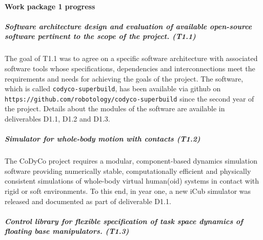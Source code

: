 

\newcommand{\EQ}{\!\!\!=\!\!\!}

\newcommand{\Bp}{\mathbf{p}}
\newcommand{\Br}{\mathbf{r}}
\newcommand{\Bf}{\mathbf{f}}
\newcommand{\BJ}{\mathbf{J}}
\newcommand{\Bv}{\mathbf{v}}
\newcommand{\BI}{\mathbf{I}}
\newcommand{\BR}{\mathbf{R}}
\newcommand{\BK}{\mathbf{K}}
\newcommand{\BD}{\mathbf{D}}
\newcommand{\BA}{\mathbf{A}}
\newcommand{\Bb}{\mathbf{b}}
\newcommand{\BM}{\mathbf{M}}
\newcommand{\BC}{\mathbf{C}}
\newcommand{\Bg}{\mathbf{g}}
\newcommand{\BS}{\mathbf{S}}
\newcommand{\Bzero}{\mathbf{0}}
\newcommand{\BN}{\mathbf{N}}
\newcommand{\Bh}{\mathbf{h}}
\newcommand{\BW}{\mathbf{W}}
\newcommand{\Bq}{\mathbf{q}}
\newcommand{\BF}{\mathbf{F}}
\newcommand{\Bn}{\mathbf{n}}

\newcommand{\Bomega}{\boldsymbol{\omega}}
\newcommand{\Btau}{\boldsymbol{\tau}}
\newcommand{\Balpha}{\boldsymbol{\alpha}}
\newcommand{\Bbeta}{\boldsymbol{\beta}}



\paragraph{Work package 1 progress}

\subparagraph{Software architecture design and evaluation of available
  open-source software pertinent to the scope of the project. (T1.1)}

The goal of T1.1 was to agree on a specific software architecture with
associated software tools whose specifications, dependencies and
interconnections meet the requirements and needs for achieving the goals of
the project.  The software, which is called \texttt{codyco-superbuild}, has
been available via github on
\texttt{https://github.com/robotology/codyco-superbuild} since the second year
of the project.  Details about the modules of the software are available in
deliverables D1.1, D1.2 and D1.3.

\subparagraph{Simulator for whole-body motion with contacts (T1.2)}

The CoDyCo project requires a modular, component-based dynamics simulation
software providing numerically stable, computationally efficient and
physically consistent simulations of whole-body virtual human(oid) systems in
contact with rigid or soft environments.  To this end, in year one, a new iCub
simulator was released and documented as part of deliverable D1.1.


\subparagraph{Control library for flexible specification of task space
  dynamics of floating base manipulators. (T1.3)}

